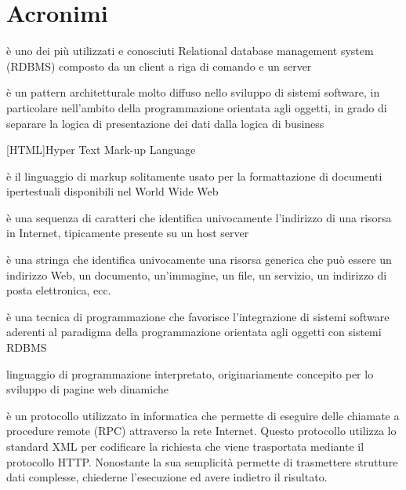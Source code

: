 \chapter{Acronimi} 
\begin{acronym}

{\small è uno dei più utilizzati e conosciuti Relational database management system (RDBMS) composto da un client a riga di comando e un server \par}
%

{\small è un pattern architetturale molto diffuso nello sviluppo di sistemi software, in particolare nell'ambito della programmazione orientata agli oggetti, in grado di separare la logica di presentazione dei dati dalla logica di business \par}
%
[HTML]{Hyper Text Mark-up Language}

{\small è il linguaggio di markup solitamente usato per la formattazione di documenti ipertestuali disponibili nel World Wide Web \par}
%

{\small è una sequenza di caratteri che identifica univocamente l'indirizzo di una risorsa in Internet, tipicamente presente su un host server \par}
%

{\small è una stringa che identifica univocamente una risorsa generica che può essere un indirizzo Web, un documento, un'immagine, un file, un servizio, un indirizzo di posta elettronica, ecc. \par}
%

{\small è una tecnica di programmazione che favorisce l'integrazione di sistemi software aderenti al paradigma della programmazione orientata agli oggetti con sistemi RDBMS \par}
%

{\small linguaggio di programmazione interpretato, originariamente concepito per lo sviluppo di pagine web dinamiche \par}
%

{\small è un protocollo utilizzato in informatica che permette di eseguire delle chiamate a procedure remote (RPC) attraverso la rete Internet. Questo protocollo utilizza lo standard XML per codificare la richiesta che viene trasportata mediante il protocollo HTTP. Nonostante la sua semplicità permette di trasmettere strutture dati complesse, chiederne l'esecuzione ed avere indietro il risultato. \par}
%


\end{acronym}
